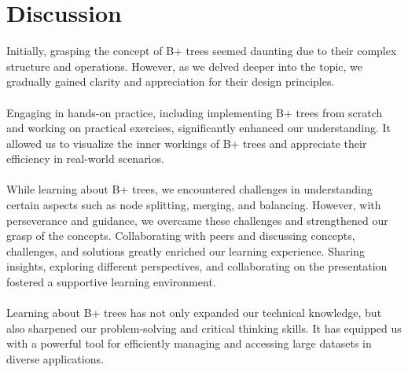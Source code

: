 \documentclass{article}
\begin{document}
    \section{Discussion}
    Initially, grasping the concept of B+ trees seemed daunting due to their complex structure and operations. However, as we delved deeper into the topic, we gradually gained clarity and appreciation for their design principles.\\ \\
    Engaging in hands-on practice, including implementing B+ trees from scratch and working on practical exercises, significantly enhanced our understanding. It allowed us to visualize the inner workings of B+ trees and appreciate their efficiency in real-world scenarios.\\ \\
    While learning about B+ trees, we encountered challenges in understanding certain aspects such as node splitting, merging, and balancing. However, with perseverance and guidance, we overcame these challenges and strengthened our grasp of the concepts. Collaborating with peers and discussing concepts, challenges, and solutions greatly enriched our learning experience. Sharing insights, exploring different perspectives, and collaborating on the presentation fostered a supportive learning environment.\\ \\
    Learning about B+ trees has not only expanded our technical knowledge, but also sharpened our problem-solving and critical thinking skills. It has equipped us with a powerful tool for efficiently managing and accessing large datasets in diverse applications.
\pagebreak


    
\end{document}
